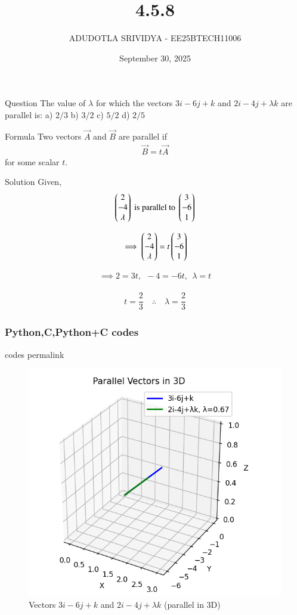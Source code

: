 \documentclass{beamer}
\title{4.5.8}
\date{September 30, 2025}
\author{ADUDOTLA SRIVIDYA - EE25BTECH11006}
\begin{document}
\frame{\titlepage}

\begin{frame}{Question}
The value of $\lambda$ for which the vectors $3i-6j+k$ and $2i-4j+\lambda k$ are parallel is:  
a) $2/3$ \quad b) $3/2$ \quad c) $5/2$ \quad d) $2/5$
\end{frame}

\begin{frame}{Formula}
Two vectors $\vec{A}$ and $\vec{B}$ are parallel if  
\begin{align}
\vec{B} = t \vec{A}
\end{align}
for some scalar $t$.
\end{frame}

\begin{frame}{Solution}
Given,
\begin{align}
    \begin{pmatrix}2\\-4\\ \lambda\end{pmatrix} \text{ is parallel to } \begin{pmatrix}3\\-6\\1\end{pmatrix}
\end{align}

\begin{align}
    \implies \begin{pmatrix}2\\-4\\ \lambda\end{pmatrix} = t \begin{pmatrix}3\\-6\\1\end{pmatrix}
\end{align}

\begin{align}
    \implies 2 = 3t, \ \ -4 = -6t, \ \ \lambda = t
\end{align}

\begin{align}
    t = \dfrac{2}{3} \quad \therefore \quad \lambda = \dfrac{2}{3}
\end{align}
\end{frame}

\begin{frame}[fragile]
\frametitle{Python,C,Python+C codes}
codes permalink
\end{frame}

\begin{frame}
\begin{figure}
    \centering
    \includegraphics[width=0.5\columnwidth]{figs/fig.png}
    \caption{Vectors $3i-6j+k$ and $2i-4j+\lambda k$ (parallel in 3D)}
    \label{fig:Vectors}
\end{figure}
\end{frame}
\end{document}
